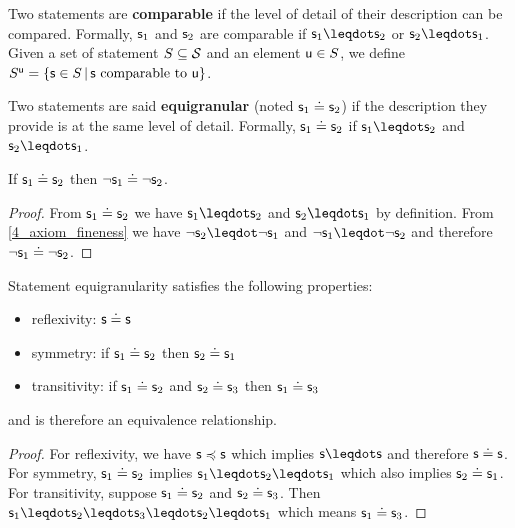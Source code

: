 \documentclass[11pt,letterpaper,fleqn]{memoir} %
\begin{document}
\begin{mathSection}
\begin{defn}
	Two statements are \textbf{comparable} if the level of detail of their description can be compared. Formally, $\stmt_1$ and $\stmt_2$ are comparable if $\stmt_1 \finer \stmt_2$ or $\stmt_2 \finer \stmt_1$. Given a set of statement $S \subseteq \logCtx$ and an element $\stmt[u] \in S$, we define $S^{\stmt[u]} = \{ \stmt \in S \, | \, \stmt \text{ comparable to } \stmt[u] \}$.
\end{defn}
	
\begin{defn}
	Two statements are said \textbf{equigranular} (noted $\stmt_1 \eqgran \stmt_2$) if the description they provide is at the same level of detail. Formally, $\stmt_1 \eqgran \stmt_2$ if $\stmt_1 \finer \stmt_2$ and $\stmt_2 \finer \stmt_1$.
\end{defn}

\begin{coro}
	If $\stmt_1 \eqgran \stmt_2$ then $\NOT \stmt_1 \eqgran \NOT \stmt_2$.
\end{coro}
\begin{proof}
	From $\stmt_1 \eqgran \stmt_2$ we have $\stmt_1 \finer \stmt_2$ and $\stmt_2 \finer \stmt_1$ by definition. From \ref{4_axiom_fineness} we have $\NOT \stmt_2 \finer \NOT \stmt_1$ and $\NOT \stmt_1 \finer \NOT \stmt_2$ and therefore $\NOT \stmt_1 \eqgran \NOT \stmt_2$.
\end{proof}

\begin{prop}
	Statement equigranularity satisfies the following properties:
	\begin{itemize}
		\item reflexivity: $\stmt \eqgran \stmt$
		\item symmetry: if $\stmt_1 \eqgran \stmt_2$ then $\stmt_2 \eqgran \stmt_1$
		\item transitivity: if $\stmt_1 \eqgran \stmt_2$ and $\stmt_2 \eqgran \stmt_3$ then $\stmt_1 \eqgran \stmt_3$
	\end{itemize}
	and is therefore an equivalence relationship.
\end{prop}
\begin{proof}
	For reflexivity, we have $\stmt \narrower \stmt$ which implies $\stmt \finer \stmt$ and therefore $\stmt \eqgran \stmt$. For symmetry, $\stmt_1 \eqgran \stmt_2$ implies $\stmt_1 \finer \stmt_2 \finer \stmt_1$ which also implies $\stmt_2 \eqgran \stmt_1$. For transitivity, suppose $\stmt_1 \eqgran \stmt_2$ and $\stmt_2 \eqgran \stmt_3$. Then $\stmt_1 \finer \stmt_2 \finer \stmt_3 \finer \stmt_2 \finer \stmt_1$ which means $\stmt_1 \eqgran \stmt_3$. 
\end{proof}


\end{mathSection}
\end{document}
